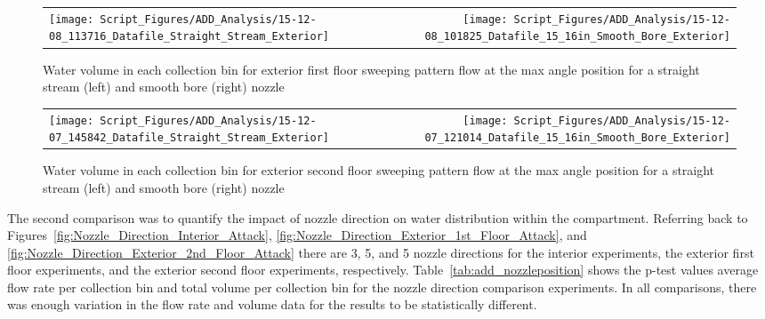 \documentclass{article}
\begin{document}
\begin{figure}[ht]
\begin{tabular*}{\textwidth}{lr}
\texttt{[image: Script\_Figures/ADD\_Analysis/15-12-08\_113716\_Datafile\_Straight\_Stream\_Exterior]} &
\texttt{[image: Script\_Figures/ADD\_Analysis/15-12-08\_101825\_Datafile\_15\_16in\_Smooth\_Bore\_Exterior]}
\end{tabular*}
\caption{Water volume in each collection bin for exterior first floor sweeping pattern flow at the max angle position for a straight stream (left) and smooth bore (right) nozzle}
\label{fig:Exterior_FirstFloor_O_Varying_Nozzle}
\end{figure}


\begin{figure}[ht]
\begin{tabular*}{\textwidth}{lr}
\texttt{[image: Script\_Figures/ADD\_Analysis/15-12-07\_145842\_Datafile\_Straight\_Stream\_Exterior]} &
\texttt{[image: Script\_Figures/ADD\_Analysis/15-12-07\_121014\_Datafile\_15\_16in\_Smooth\_Bore\_Exterior]}
\end{tabular*}
\caption{Water volume in each collection bin for exterior second floor sweeping pattern flow at the max angle position for a straight stream (left) and smooth bore (right) nozzle}
\label{fig:Exterior_SecondFloor_O_Varying_Nozzle}
\end{figure}


\clearpage


The second comparison was to quantify the impact of nozzle direction on water distribution within the compartment. Referring back to Figures~\ref{fig:Nozzle_Direction_Interior_Attack}, \ref{fig:Nozzle_Direction_Exterior_1st_Floor_Attack}, and \ref{fig:Nozzle_Direction_Exterior_2nd_Floor_Attack} there are 3, 5, and 5 nozzle directions for the interior experiments, the exterior first floor experiments, and the exterior second floor experiments, respectively. Table~\ref{tab:add_nozzleposition} shows the p-test values average flow rate per collection bin and total volume per collection bin for the nozzle direction comparison experiments. In all comparisons, there was enough variation in the flow rate and volume data for the results to be statistically different.
\end{document}
